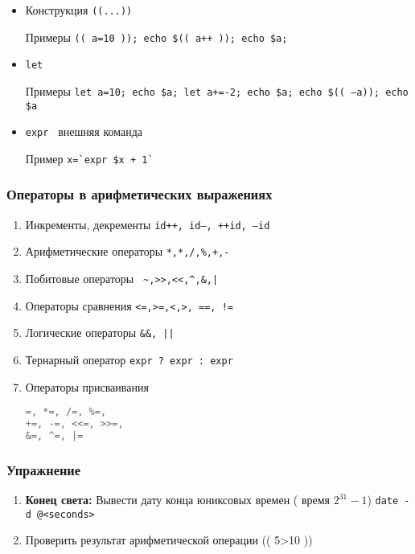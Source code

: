 
\begin{frame}
  \frametitle{}
  \begin{itemize}
   \item  Конструкция {\tt ((...))}
    \begin{block}{Примеры}
     {\tt (( a=10 )); echo \$(( a++ )); echo \$a; } 
    \end{block}
   \item  {\tt let}
    \begin{block}{Примеры}
     {\tt let a=10; echo \$a; let a+=-2; echo \$a; echo \$(( --a)); echo \$a} 
    \end{block}
   \item  {\tt expr } внешняя команда 
    \begin{block}{Пример}
       { \tt x=\`{}expr \$x + 1\`{} }
    \end{block}
  \end{itemize}
\end{frame}

\begin{frame}[fragile]
\frametitle{Операторы в арифметических выражениях}
\begin{enumerate}
\item Инкременты, декременты {\tt id++, id--, ++id, --id } 
\item Арифметические операторы {\tt **,*,/,\%,+,-} 
\item Побитовые операторы {\verb+ ~,>>,<<,^,&,|+}
\item Операторы сравнения {\tt <=,>=,<,>, ==, !=}
\item Логические операторы {\tt \&\&, || } 
\item Тернарный оператор {\tt expr ? expr : expr }
\item Операторы присваивания
\begin{lstlisting}[language=C]
=, *=, /=, %=,
+=, -=, <<=, >>=,
&=, ^=, |=  
\end{lstlisting}
\end{enumerate} 

  
\end{frame}

\begin{frame}[fragile]
  \frametitle{Упражнение}
 \begin{enumerate}
   \item {\bf Конец света:} Вывести дату конца юниксовых времен ( время $2^{31}-1$) {\tt date -d @<seconds> } 
   \item Проверить результат арифметической операции (( 5>10 ))
 \end{enumerate}
\end{frame}
